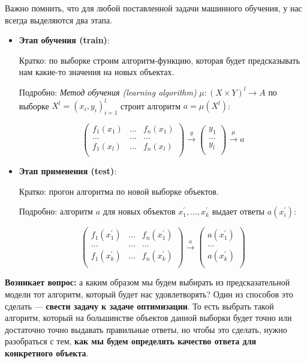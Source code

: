 \documentclass{article}
\begin{document}
Важно помнить, что для любой поставленной задачи машинного обучения, у нас всегда выделяются два этапа.
\\

\begin{itemize}

\item\textbf{Этап обучения (train)}:

Кратко: по выборке строим алгоритм-функцию, которая будет предсказывать нам какие-то значения на новых объектах.

Подробно: \textit{Метод обучения (learning algorithm)} $\mu : (X \times Y)^l \rightarrow A$ по выборке $X^l = (x_i, y_i)_{i = 1}^l$ строит алгоритм $a = \mu(X^l)$:

$$\boxed{
\begin{pmatrix}
f_1(x_1) & \ldots & f_n(x_1)\\
\ldots & \ldots & \ldots\\
f_1(x_l) & \ldots & f_n(x_l)\\
\end{pmatrix}
\xrightarrow{\ y\ }
\begin{pmatrix}
y_1\\
\ldots\\
y_l\\
\end{pmatrix}
}\xrightarrow{\ \mu\ } a$$

\item \textbf{Этап применения (test)}:

Кратко: прогон алгоритма по новой выборке объектов. 

Подробно: алгоритм $a$ для новых объектов $x_1^{'}, \ldots, x_k^{'}$ выдает ответы $a(x_i^{'})$:

$$\begin{pmatrix}
f_1(x_1^{'}) & \ldots & f_n(x_1^{'})\\
\ldots & \ldots & \ldots\\
f_1(x_k^{'}) & \ldots & f_n(x_k^{'})\\
\end{pmatrix}
\xrightarrow{\ a\ }
\begin{pmatrix}
a(x_1^{'})\\
\ldots\\
a(x_k^{'})\\
\end{pmatrix}$$
\end{itemize}

\quad

\textbf{Возникает вопрос:} а каким образом мы будем выбирать из предсказательной модели тот алгоритм, который будет нас удовлетворять? Один из способов это сделать --- \textbf{свести задачу к задаче оптимизации}. То есть выбрать такой алгоритм, который на большинстве объектов данной выборки будет точно или достаточно точно выдавать правильные ответы, но чтобы это сделать, нужно разобраться с тем, \textbf{как мы будем определять качество ответа для конкретного объекта}.
\end{document}
